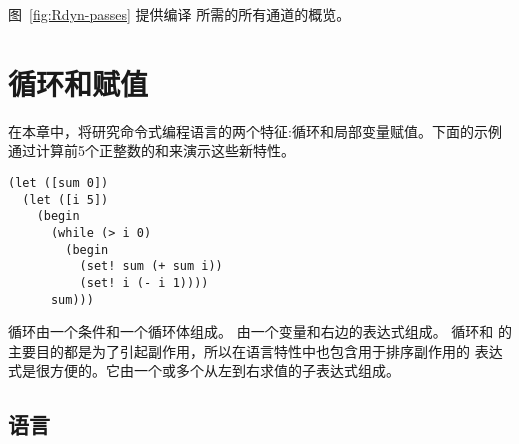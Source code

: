 \documentclass[11pt]{book}
\begin{document}
图~\ref{fig:Rdyn-passes} 提供编译 \LangDyn{} 所需的所有通道的概览。


\chapter{循环和赋值}
\label{ch:Rwhile}




在本章中，将研究命令式编程语言的两个特征:循环和局部变量赋值。下面的示例通过计算前5个正整数的和来演示这些新特性。
\begin{lstlisting}
(let ([sum 0])
  (let ([i 5])
    (begin
      (while (> i 0)
        (begin
          (set! sum (+ sum i))
          (set! i (- i 1))))
      sum)))
\end{lstlisting}
  循环由一个条件和一个循环体组成。
%
  由一个变量和右边的表达式组成。
%
  循环和  的主要目的都是为了引起副作用，所以在语言特性中也包含用于排序副作用的  表达式是很方便的。它由一个或多个从左到右求值的子表达式组成。

\section{ \LangLoop{} 语言}
\end{document}
